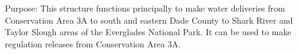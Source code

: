 Purpose:
This structure functions principally to make water deliveries from Conservation Area 3A to south and eastern Dade County to Shark River and Taylor Slough areas of the Everglades National Park. It can be used to make regulation releases from Conservation Area 3A. %



